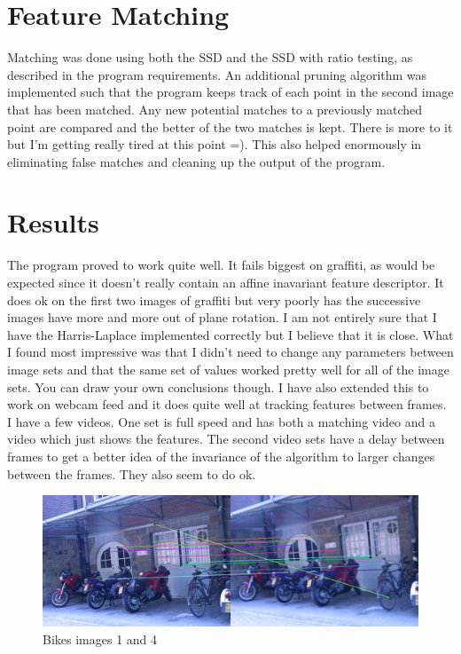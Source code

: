 \documentclass[10pt,twocolumn,letterpaper]{article}
\begin{document}
\section{Feature Matching}
Matching was done using both the SSD and the SSD with ratio testing, as described in the program requirements. An additional pruning algorithm was implemented such that the program keeps track of each point in the second image that has been matched. Any new potential matches to a previously matched point are compared and the better of the two matches is kept. There is more to it but I'm getting really tired at this point =). This also helped enormously in eliminating false matches and cleaning up the output of the program.

\section{Results}
The program proved to work quite well. It fails biggest on graffiti, as would be expected since it doesn't really contain an affine inavariant feature descriptor. It does ok on the first two images of graffiti but very poorly has the successive images have more and more out of plane rotation. I am not entirely sure that I have the Harris-Laplace implemented correctly but I believe that it is close. What I found most impressive was that I didn't need to change any parameters between image sets and that the same set of values worked pretty well for all of the image sets. You can draw your own conclusions though. I have also extended this to work on webcam feed and it does quite well at tracking features between frames. I have a few videos. One set is full speed and has both a matching video and a video which just shows the features. The second video sets have a delay between frames to get a better idea of the invariance of the algorithm to larger changes between the frames. They also seem to do ok.

\begin{figure}[ht!]
\centering
\includegraphics[width=1\textwidth]{img/bikes1_4_ratio.jpg}
\caption{Bikes images 1 and 4}
\label{fig:bikes}
\end{figure}
\end{document}
